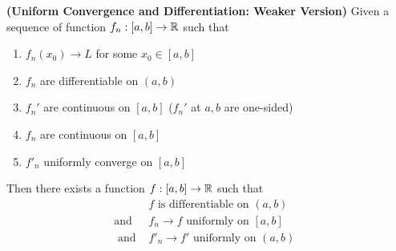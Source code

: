 \documentclass{report}
\begin{document}
\begin{theorem}
\textbf{(Uniform Convergence and Differentiation: Weaker Version)} Given a sequence of function $f_n:[a,b]\rightarrow \mathbb{R}$ such that 
\begin{enumerate}[label=(\alph*)]
  \item $f_n(x_0)\to L$ for some $x_0 \in [a,b]$
  \item $f_n$ are differentiable on $(a,b)$  
  \item $f_n'$ are continuous on $[a,b]$ ($f_n'$ at  $a,b$ are one-sided)
  \item $f_n$ are continuous on  $[a,b]$
  \item $f'_n$ uniformly converge on  $[a,b]$
\end{enumerate}
Then there exists a function $f:[a,b]\rightarrow \mathbb{R}$ such that 
\begin{align*}
&f\text{ is differentiable on $(a,b)$ }\\
  \text{and }&f_n \to f\text{ uniformly on $[a,b]$}\\
  \text{ and }&f'_n \to f'\text{ uniformly on $(a,b)$ } 
\end{align*}
\end{theorem}
\end{document}
